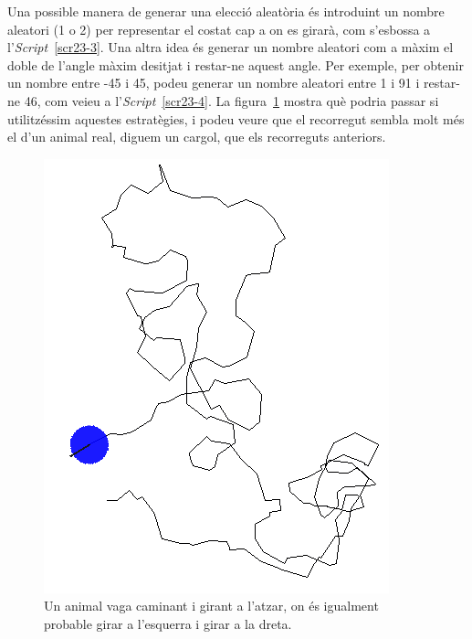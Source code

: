 Una possible manera de generar una elecció aleatòria és introduint un nombre aleatori (1 o 2) per representar el costat cap a on es girarà, com s'esbossa a l'\emph{Script}~\ref{scr23-3}. Una altra idea és generar un nombre aleatori com a màxim el doble de l'angle màxim desitjat i restar-ne aquest angle. Per exemple, per obtenir un nombre entre -45 i 45, podeu generar un nombre aleatori entre 1 i 91 i restar-ne 46, com veieu a l'\emph{Script}~\ref{scr23-4}. La figura~\ref{fig2304} mostra què podria passar si utilitzéssim aquestes estratègies, i podeu veure que el recorregut sembla molt més el d'un animal real, diguem un cargol, que els recorreguts anteriors.
\begin{figure}[h!]
\begin{center}
\includegraphics[scale=0.5]{Imatges/figura23-4}
\end{center}
\caption{Un animal vaga caminant i girant a l'atzar, on és igualment probable girar a l'esquerra i girar a la dreta.}
\label{fig2304}
\end{figure}

